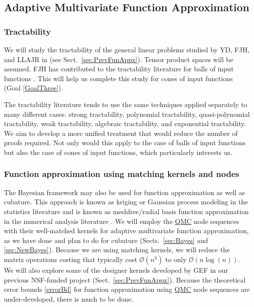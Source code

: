 \documentclass[11pt]{NSFamsart}
\newcommand{\QMC}{\hyperlink{QMClink}{QMC}\xspace}
\newcommand{\Order}{\mathcal{O}}
\begin{document}
\subsection{Adaptive Multivariate Function Approximation}

\subsubsection{Tractability} \label{sec:tract}

We will study the tractability of the general linear problems studied by YD, FJH, and LLAJR in \cite{DinHic20a} (see Sect.\ \ref{sec:PrevFunAppx}).  Tensor product spaces will be assumed.  FJH has contributed to the tractability literature for balls of input functions
\cite{FasHicWoz12b,WanHic00b,HicWoz00b,HicSloWas03c,HicSloWas03b,HicSloWas03a,HicSloWas03e,HicWasWoz06a,YueHic04a,YueHic05a,ZhoHic15a}.  This will help us complete this study for cones of input functions (Goal \ref{GoalThree}).

The tractability literature tends to use the same techniques applied separately to many different cases:  strong tractability, polynomial tractability, quasi-polynomial tractability, weak tractability, algebraic tractability, and exponential tractability.  We aim to develop a more unified treatment that would reduce the number of proofs required. Not only would this apply to the case of balls of input functions but also the case of cones of input functions, which particularly interests us.


\subsubsection{Function approximation using matching kernels and nodes}

The Bayesian framework may also be used for function approximation as well as cubature.  This approach is known as kriging or Gaussian process modeling in the statistics literature \cite{RasWil06a,Ste99} and is known as meshfree/radial basis function 
approximation in the numerical analysis literature \cite{Fas07a,FasMcC15a,Wen05a}.  We will employ the \QMC node sequences with their well-matched kernels for adaptive multivariate function 
approximation, as we have done and plan to do for cubature (Sects.\ \ref{sec:Bayes} and \ref{sec:NewBayes}).  Because we are using matching kernels, we will reduce the matrix operations costing that typically cost $\Order(n^3)$ to only $\Order(n \log(n))$.  We will also explore some of the designer kernels developed by GEF in our previous NSF-funded  project (Sect.\ \ref{sec:PrevFunAppx}).  Because the theoretical error bounds \eqref{errorBd} for function approximation using \QMC node sequences are under-developed, there is much to be done.
\end{document}
